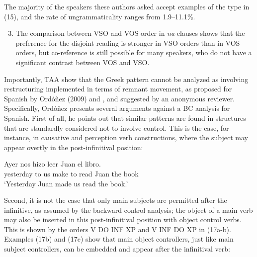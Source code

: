 \documentclass[output=paper]{langsci/langscibook}
\begin{document}
The majority of the speakers these authors asked accept examples of the type in (15), and the rate of ungrammaticality ranges from 1.9--11.1\%.  

\begin{enumerate}\setcounter{enumi}{2}
\item The comparison between VSO and VOS order in \textit{na}{}-clauses shows that the preference for the disjoint reading is stronger in VSO orders than in VOS orders, but co-reference is still possible for many speakers, who do not have a significant contrast between VOS and VSO. 
\end{enumerate}

Importantly, TAA show that the Greek pattern cannot be analyzed as involving restructuring implemented in terms of remnant movement, as proposed for Spanish by Ordóñez (2009) and \citet{Herbeck2013}, and suggested by an anonymous reviewer. Specifically, Ordóñez presents several arguments against a BC analysis for Spanish. First of all, he points out that similar patterns are found in structures that are standardly considered not to involve control. This is the case, for instance, in causative and perception verb constructions, where the subject may appear overtly in the post-infinitival position:

\ea%
    \label{ex:alexiadou:16}
    \gll Ayer     nos   hizo   leer   Juan   el libro.  \\
           yesterday   to us   make   to read Juan   the book  \\
    \glt   ‘Yesterday Juan made us read the book.’  
    \z

           

Second, it is not the case that only main subjects are permitted after the infinitive, as assumed by the backward control analysis; the object of a main verb may also be inserted in this post-infinitival position with object control verbs. This is shown by the orders V DO INF XP and V INF DO XP in (17a-b). Examples (17b) and (17c) show that main object controllers, just like main subject controllers, can be embedded and appear after the infinitival verb:

\ea%
    \label{ex:alexiadou:17}
    \z
\z    
\end{document}
